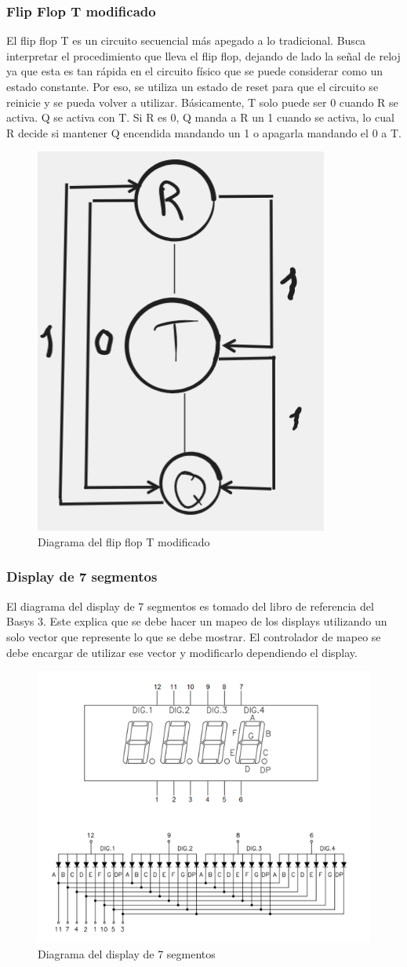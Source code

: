 \documentclass[12pt]{article}  %
\begin{document}
\newpage

\subsubsection{Flip Flop T modificado}
El flip flop T es un circuito secuencial más apegado a lo tradicional. Busca interpretar el procedimiento que lleva el flip flop, dejando de lado la señal de reloj ya que esta es tan rápida en el circuito físico que se puede considerar como un estado constante. Por eso, se utiliza un estado de reset para que el circuito se reinicie y se pueda volver a utilizar. Básicamente, T solo puede ser 0 cuando R se activa. Q se activa con T. Si R es 0, Q manda a R un 1 cuando se activa, lo cual R decide si mantener Q encendida mandando un 1 o apagarla mandando el 0 a T.

\begin{figure}[!ht]
  \centering
  \caption{Diagrama del flip flop T modificado}
  \includegraphics[width=0.25\linewidth]{Imagenes/Diagramas/Flipflop.png}
\end{figure}

\subsubsection{Display de 7 segmentos}
El diagrama del display de 7 segmentos es tomado del libro de referencia del Basys 3. Este explica que se debe hacer un mapeo de los displays utilizando un solo vector que represente lo que se debe mostrar. El controlador de mapeo se debe encargar de utilizar ese vector y modificarlo dependiendo el display.

\begin{figure}[!ht]
  \centering
  \caption{Diagrama del display de 7 segmentos \cite{digilent2023}}
  \includegraphics[width=0.25\linewidth]{Imagenes/Diagramas/7seg.png}
\end{figure}
\end{document}
